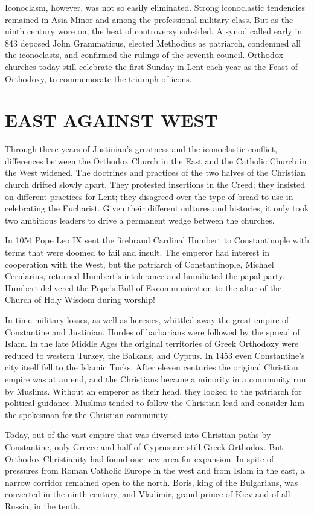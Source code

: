 Iconoclasm, however, was not so easily eliminated. Strong iconoclastic tendencies remained in Asia
Minor and among the professional military class. But as the ninth century wore on, the heat of
controversy subsided. A synod called early in 843 deposed John Grammaticus, elected Methodius as
patriarch, condemned all the iconoclasts, and confirmed the rulings of the seventh council. Orthodox
churches today still celebrate the first Sunday in Lent each year as the Feast of Orthodoxy, to
commemorate the triumph of icons.

\section{EAST AGAINST WEST}

Through these years of Justinian’s greatness and the iconoclastic conflict, differences between the
Orthodox Church in the East and the Catholic Church in the West widened. The doctrines and practices
of the two halves of the Christian church drifted slowly apart. They protested insertions in the
Creed; they insisted on different practices for Lent; they disagreed over the type of bread to use
in celebrating the Eucharist. Given their different cultures and histories, it only took two
ambitious leaders to drive a permanent wedge between the churches.

In 1054 Pope Leo IX sent the firebrand Cardinal Humbert to Constantinople with terms that were
doomed to fail and insult. The emperor had interest in cooperation with the West, but the patriarch
of Constantinople, Michael Cerularius, returned Humbert’s intolerance and humiliated the papal
party. Humbert delivered the Pope’s Bull of Excommunication to the altar of the Church of Holy
Wisdom during worship!

In time military losses, as well as heresies, whittled away the great empire of Constantine and
Justinian. Hordes of barbarians were followed by the spread of Islam. In the late Middle Ages the
original territories of Greek Orthodoxy were reduced to western Turkey, the Balkans, and Cyprus. In
1453 even Constantine’s city itself fell to the Islamic Turks. After eleven centuries the original
Christian empire was at an end, and the Christians became a minority in a community run by Muslims.
Without an emperor as their head, they looked to the patriarch for political guidance. Muslims
tended to follow the Christian lead and consider him the spokesman for the Christian community.

Today, out of the vast empire that was diverted into Christian paths by Constantine, only Greece and
half of Cyprus are still Greek Orthodox. But Orthodox Christianity had found one new area for
expansion. In spite of pressures from Roman Catholic Europe in the west and from Islam in the east,
a narrow corridor remained open to the north. Boris, king of the Bulgarians, was converted in the
ninth century, and Vladimir, grand prince of Kiev and of all Russia, in the tenth.

